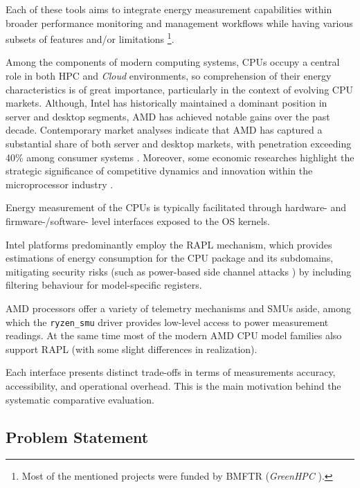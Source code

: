 Each of these tools aims to integrate energy measurement capabilities within
broader performance monitoring and management workflows while having various
subsets of features and/or limitations \footnote{
Most of the mentioned projects were funded by \gls{BMFTR} (\emph{GreenHPC}
\parencite{GreenHPC}).
}.

Among the components of modern computing systems, \gls{CPU}s occupy a central
role in both \gls{HPC} and \emph{Cloud} environments, so comprehension
of their energy characteristics is of great importance, particularly
in the context of evolving \gls{CPU} markets. Although, Intel has historically
maintained a dominant position in server and desktop segments, AMD has
achieved notable gains over the past decade. Contemporary market analyses
indicate that AMD has captured a substantial share of both server and
desktop markets, with penetration exceeding 40\% among consumer systems
\parencite{NetworkWorld2025_Q1ServerShare}. Moreover, some economic researches
highlight the strategic significance of competitive dynamics
and innovation within the microprocessor industry
\parencite{GoettlerGordon2009_Competition}.

Energy measurement of the \gls{CPU}s is typically facilitated through
hardware- and firmware-/software- level interfaces exposed to the \gls{OS}
kernels.

Intel platforms predominantly employ the \gls{RAPL} mechanism, which provides
estimations of energy consumption for the \gls{CPU} package and its subdomains,
mitigating security risks (such as power-based side channel attacks
\parencite{PwrLeak_2023}) by including filtering behaviour for model-specific
registers.\parencite{IntelRAPL}

AMD processors offer a variety of telemetry mechanisms and \gls{SMU}s aside,
among which the \texttt{ryzen\_smu} \parencite{RyzenSMU_GitHub} driver provides
low-level access to power measurement readings. At the same time most of the
modern AMD \gls{CPU} model families also support \gls{RAPL} (with some slight
differences in realization).

Each interface presents distinct trade-offs in terms of measurements
accuracy, accessibility, and operational overhead. This is the main motivation
behind the systematic comparative evaluation.

\subsection{Problem Statement}


